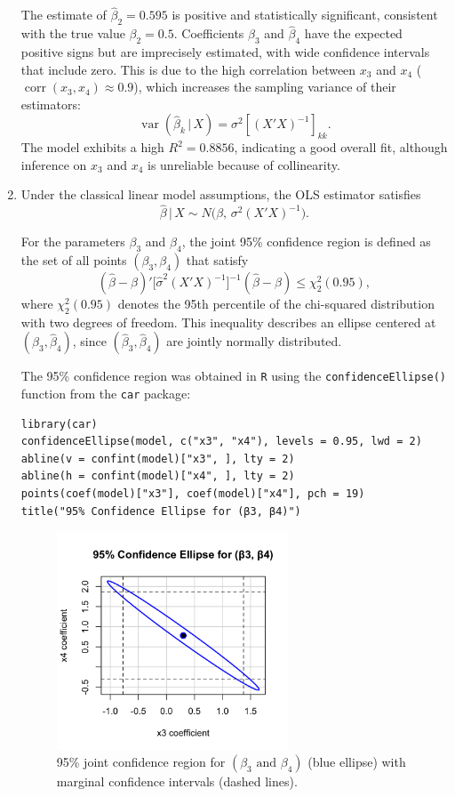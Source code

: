 \begin{enumerate}[label=(\roman*)]
\noindent
The estimate of $\hat{\beta}_2 = 0.595$ is positive and statistically significant, consistent with the true value $\beta_2 = 0.5$.  
Coefficients $\hat{\beta}_3$ and $\hat{\beta}_4$ have the expected positive signs but are imprecisely estimated, with wide confidence intervals that include zero.  
This is due to the high correlation between $x_{3}$ and $x_{4}$ ($\operatorname{corr}(x_{3},x_{4}) \approx 0.9$), which increases the sampling variance of their estimators:
\[
\operatorname{var}(\hat{\beta}_k \,|\, X) = \sigma^2 [(X'X)^{-1}]_{kk}.
\]
The model exhibits a high $R^2 = 0.8856$, indicating a good overall fit, although inference on $x_{3}$ and $x_{4}$ is unreliable because of collinearity.

\item
Under the classical linear model assumptions, the OLS estimator satisfies
\[
\hat{\beta} \,|\, X \sim N\!\big(\beta,\, \sigma^2 (X'X)^{-1}\big).
\]

For the parameters $\beta_3$ and $\beta_4$, the joint 95\% confidence region is defined as the set of all points $(\beta_3, \beta_4)$ that satisfy
\[
(\hat{\beta} - \beta)' 
\Big[\hat{\sigma}^2 (X'X)^{-1}\Big]^{-1}
(\hat{\beta} - \beta)
\le \chi^2_{2}(0.95),
\]
where $\chi^2_{2}(0.95)$ denotes the 95th percentile of the chi-squared distribution with two degrees of freedom.  
This inequality describes an ellipse centered at $(\hat{\beta}_3, \hat{\beta}_4)$, since $(\hat{\beta}_3, \hat{\beta}_4)$ are jointly normally distributed.

\medskip
\noindent
The 95\% confidence region was obtained in \texttt{R} using the \texttt{confidenceEllipse()} function from the \texttt{car} package:

\begin{verbatim}
library(car)
confidenceEllipse(model, c("x3", "x4"), levels = 0.95, lwd = 2)
abline(v = confint(model)["x3", ], lty = 2)
abline(h = confint(model)["x4", ], lty = 2)
points(coef(model)["x3"], coef(model)["x4"], pch = 19)
title("95% Confidence Ellipse for (β3, β4)")
\end{verbatim}

\begin{figure}[H]
\centering
\includegraphics[width=0.65\textwidth]{fig/1aii.png}
\caption{95\% joint confidence region for $(\beta_3 \text{ and } \beta_4)$ (blue ellipse) with marginal confidence intervals (dashed lines).}
\label{fig:ellipse}
\end{figure}


\end{enumerate}
